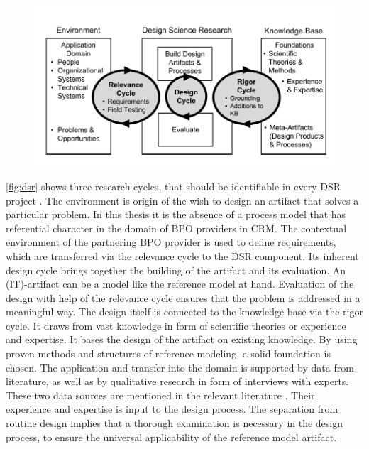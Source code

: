 			
\begin{figure}[caption={Design science research cycles}, label={fig:dsr}]
	{	\includegraphics[width=.8\textwidth]{figures/dsr.pdf}
	} \\
\end{figure}


\Fig \ref{fig:dsr} shows three research cycles, that should be identifiable in every \acrshort{DSR} project \citep{Hevner2010}. The environment is origin of the wish to design an artifact that solves a particular problem. In this thesis it is the absence of a process model that has referential character in the domain of \acrshort{BPO} providers in \acrshort{CRM}. The contextual environment of the partnering  \acrshort{BPO} provider is used to define requirements, which are transferred via the relevance cycle to the \acrshort{DSR} component. Its inherent design cycle brings together the building of the artifact and its evaluation. An (IT)-artifact can be a model \citep{Hevner2010} like the reference model at hand. Evaluation of the design with help of the relevance cycle ensures that the problem is addressed in a meaningful way. The design itself is connected to the knowledge base via the rigor cycle. It draws from vast knowledge in form of scientific theories or experience and expertise. It bases the design of the artifact on existing knowledge. By using proven methods and structures of reference modeling, a solid foundation is chosen. The application and transfer into the domain is supported by data from literature, as well as by qualitative research in form of interviews with experts. These two data sources are mentioned in the relevant literature \citep[]{thomas2006mang}. Their experience and expertise is input to the design process. The separation from routine design implies that a thorough examination is necessary in the design process, to ensure the universal applicability of the reference model artifact. 


